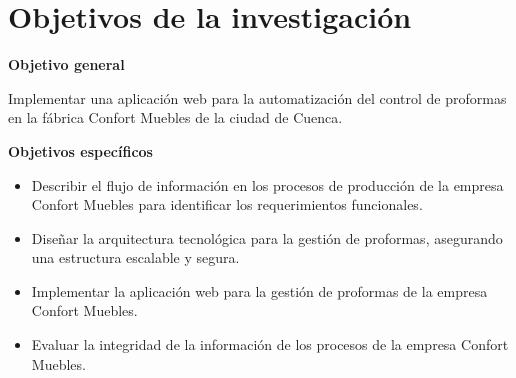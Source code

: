 \section*{Objetivos de la investigación}

\textbf{Objetivo general}

Implementar una aplicación web para la automatización del control de proformas en la fábrica Confort Muebles de la ciudad de Cuenca.

\vspace{1em} %

\textbf{Objetivos específicos}

\begin{itemize}
    \item Describir el flujo de información en los procesos de producción de la empresa Confort Muebles para identificar los requerimientos funcionales.
    \item Diseñar la arquitectura tecnológica para la gestión de proformas, asegurando una estructura escalable y segura.
    \item Implementar la aplicación web para la gestión de proformas de la empresa Confort Muebles.
    \item Evaluar la integridad de la información de los procesos de la empresa Confort Muebles.
\end{itemize}
